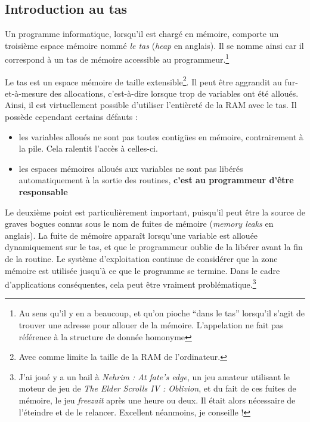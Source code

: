 \documentclass[../../../main.tex]{subfiles}
\begin{document}
\subsection{Introduction au tas}
Un programme informatique, lorsqu'il est chargé en mémoire, comporte un troisième espace mémoire nommé \textit{le tas} (\textit{heap} en anglais). Il se nomme ainsi car il correspond à un tas de mémoire accessible au programmeur.\footnote{Au sens qu'il y en a beaucoup, et qu'on pioche ``dans le tas'' lorsqu'il s'agit de trouver une adresse pour allouer de la mémoire. L'appelation ne fait pas référence à la structure de donnée homonyme}
 
Le tas est un espace mémoire de taille extensible\footnote{Avec comme limite la taille de la RAM de l'ordinateur.}. Il peut être aggrandit au fur-et-à-mesure des allocations, c'est-à-dire lorsque trop de variables ont été alloués. Ainsi, il est virtuellement possible d'utiliser l'entièreté de la RAM avec le tas. Il possède cependant certains défauts :
\begin{itemize}
	\item les variables alloués ne sont pas toutes contigües en mémoire, contrairement à la pile. Cela ralentit l'accès à celles-ci.
	\item les espaces mémoires alloués aux variables ne sont pas libérés automatiquement à la sortie des routines, \textbf{c'est au programmeur d'être responsable}
\end{itemize}
Le deuxième point est particulièrement important, puisqu'il peut être la source de graves bogues connus sous le nom de fuites de mémoire (\textit{memory leaks} en anglais). La fuite de mémoire apparaît lorsqu'une variable est allouée dynamiquement sur le tas, et que le programmeur oublie de la libérer avant la fin de la routine. Le système d'exploitation continue de considérer que la zone mémoire est utilisée jusqu'à ce que le programme se termine. Dans le cadre d'applications conséquentes, cela peut être vraiment problématique.\footnote{J'ai joué y a un bail à \textit{Nehrim : At fate's edge}, un jeu amateur utilisant le moteur de jeu de \textit{The Elder Scrolls IV : Oblivion}, et du fait de ces fuites de mémoire, le jeu \textit{freezait} après une heure ou deux. Il était alors nécessaire de l'éteindre et de le relancer. Excellent néanmoins, je conseille !}
 
\end{document}
